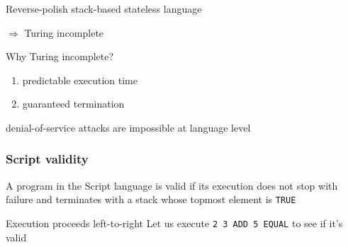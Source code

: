 \documentclass[11pt]{beamer}  %
\begin{document}
\begin{frame}
\begin{greenbox}{Reverse-polish stack-based stateless language}
    \begin{center}
      \alert{$\Rightarrow$ Turing incomplete}
    \end{center}

  \end{greenbox}

  \bigskip

  \begin{greenbox}{Why Turing incomplete?}
    \begin{enumerate}
    \item predictable execution time
    \item guaranteed termination
    \end{enumerate}

    \begin{center}
      denial-of-service attacks are impossible at language level
    \end{center}

  \end{greenbox}

\end{frame}

\begin{frame}\frametitle{Script validity}

  \begin{greenbox}{}
    A program in the Script language is \alert{valid} if its execution
    does not stop with failure and terminates with a stack whose topmost element is \texttt{TRUE}
  \end{greenbox}

  \bigskip

  \begin{greenbox}{Execution proceeds left-to-right}
    Let us execute \texttt{2 3 ADD 5 EQUAL} to see if it's valid
  \end{greenbox}

\end{frame}
\end{document}

